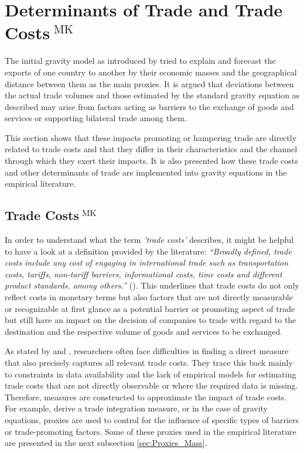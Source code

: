 \section[Determinants of Trade and Trade Costs]{Determinants of Trade and Trade Costs$^{\text{ MK}}$}
\label{sec:Determinants_of_Trade}

The initial gravity model as introduced by \textcite{tinbergen1962shaping} tried to explain and forecast the exports of one country to another by their economic masses and the geographical distance between them as the main proxies.
It is argued that deviations between the actual trade volumes and those estimated by the standard gravity equation as described may arise from factors acting as barriers to the exchange of goods and services or supporting bilateral trade among them.    

This section shows that these impacts promoting or hampering trade are directly related to trade costs and that they differ in their characteristics and the channel through which they exert their impacts. It is also presented how these trade costs and other determinants of trade are implemented into gravity equations in the empirical literature. 

\subsection[Trade Costs]{Trade Costs$^{\text{ MK}}$}
\label{sec:Proxies_Distance}

In order to understand what the term \textit{'trade costs'} describes, it might be helpful to have a look at a definition provided by the literature: \textit{\enquote{Broadly defined, trade costs include any cost of engaging in international trade such as transportation costs, tariffs, non-tariff barriers, informational costs, time costs and different product standards, among others.}} (\cite{CHEN2011206}). This underlines that trade costs do not only reflect costs in monetary terms but also factors that are not directly measurable or recognizable at first glance as a potential barrier or promoting aspect of trade but still have an impact on the decision of companies to trade with regard to the destination and the respective volume of goods and services to be exchanged.

As stated by \textcite{Anderson_2004} and \textcite{CHEN2011206}, researchers often face difficulties in finding a direct measure that also precisely captures all relevant trade costs. They trace this back mainly to constraints in data availability and the lack of empirical models for estimating trade costs that are not directly observable or where the required data is missing. Therefore, measures are constructed to approximate the impact of trade costs. For example, \textcite{CHEN2011206} derive a trade integration measure, or in the case of gravity equations, proxies are used to control for the influence of specific types of barriers or trade-promoting factors. Some of these proxies used in the empirical literature are presented in the next subsection \ref{sec:Proxies_Mass}.

